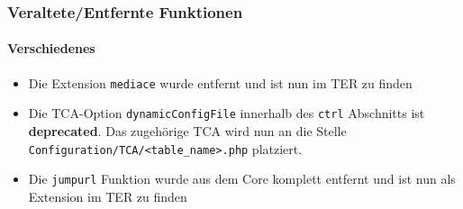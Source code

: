 
\begin{frame}[fragile]
	\frametitle{Veraltete/Entfernte Funktionen}
	\framesubtitle{Verschiedenes}

	\begin{itemize}

		\item Die Extension \texttt{mediace} wurde entfernt und ist nun im TER zu finden

		\item Die TCA-Option \texttt{dynamicConfigFile} innerhalb des \texttt{ctrl} Abschnitts ist \textbf{deprecated}.
			Das zugehörige TCA wird nun an die Stelle \texttt{Configuration/TCA/<table\_name>.php} platziert.

		\item Die \texttt{jumpurl} Funktion wurde aus dem Core komplett entfernt und ist nun als Extension im TER zu finden

	\end{itemize}

\end{frame}

